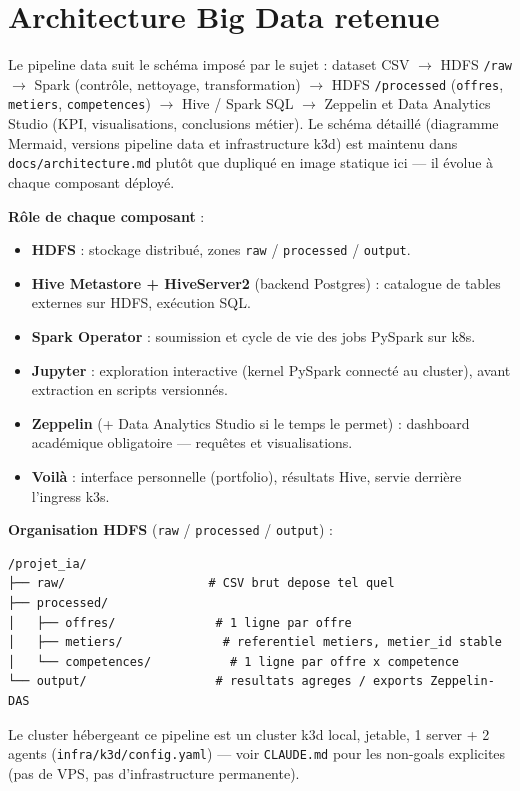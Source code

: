 \section{Architecture Big Data retenue}

Le pipeline data suit le schéma imposé par le sujet : dataset CSV
$\rightarrow$ HDFS \texttt{/raw} $\rightarrow$ Spark (contrôle, nettoyage,
transformation) $\rightarrow$ HDFS \texttt{/processed} (\texttt{offres},
\texttt{metiers}, \texttt{competences}) $\rightarrow$ Hive / Spark SQL
$\rightarrow$ Zeppelin et Data Analytics Studio (KPI, visualisations,
conclusions métier). Le schéma détaillé (diagramme Mermaid, versions
pipeline data et infrastructure k3d) est maintenu dans
\texttt{docs/architecture.md} plutôt que dupliqué en image statique ici —
il évolue à chaque composant déployé.

\textbf{Rôle de chaque composant} :
\begin{itemize}
  \item \textbf{HDFS} : stockage distribué, zones \texttt{raw} /
    \texttt{processed} / \texttt{output}.
  \item \textbf{Hive Metastore + HiveServer2} (backend Postgres) :
    catalogue de tables externes sur HDFS, exécution SQL.
  \item \textbf{Spark Operator} : soumission et cycle de vie des jobs
    PySpark sur k8s.
  \item \textbf{Jupyter} : exploration interactive (kernel PySpark
    connecté au cluster), avant extraction en scripts versionnés.
  \item \textbf{Zeppelin} (+ Data Analytics Studio si le temps le permet)
    : dashboard académique obligatoire — requêtes et visualisations.
  \item \textbf{Voilà} : interface personnelle (portfolio), résultats
    Hive, servie derrière l'ingress k3s.
\end{itemize}

\textbf{Organisation HDFS} (\texttt{raw} / \texttt{processed} /
\texttt{output}) :
\begin{lstlisting}
/projet_ia/
├── raw/                    # CSV brut depose tel quel
├── processed/
│   ├── offres/              # 1 ligne par offre
│   ├── metiers/              # referentiel metiers, metier_id stable
│   └── competences/           # 1 ligne par offre x competence
└── output/                  # resultats agreges / exports Zeppelin-DAS
\end{lstlisting}

Le cluster hébergeant ce pipeline est un cluster k3d local, jetable,
1 server + 2 agents (\texttt{infra/k3d/config.yaml}) — voir
\texttt{CLAUDE.md} pour les non-goals explicites (pas de VPS, pas
d'infrastructure permanente).

